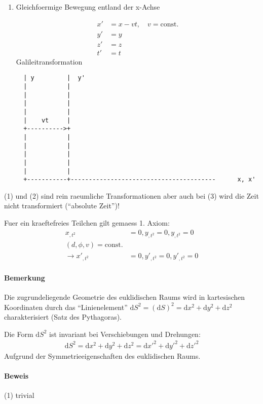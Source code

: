 \documentclass{scrartcl}
\begin{document}
\begin{enumerate}
\item Gleichfoermige Bewegung entland der x-Achse

\begin{align}
  x'&=x-vt,\quad v=\textrm{const.}\\
  y'&=y \\
  z'&=z \\
  t'&=t
\end{align}
Galileitransformation

\begin{verbatim}
  | y         |  y'
  |           |
  |           |
  |           |
  |           |
  |    vt     |
  +---------->+
  |           |
  |           |
  |           |
  |           |
  |           |
  +-----------+----------------------------------------      x, x'
\end{verbatim}


\end{enumerate}

(1) und (2) sind rein raeumliche Transformationen aber auch bei (3)
wird die Zeit nicht transformiert (``absolute Zeit'')!

Fuer ein kraeftefreies Teilchen gilt gemaess 1. Axiom:
\begin{align}
  x_{,t^2}&=0, y_{,t^2}=0, y_{,t^2}=0 \\
  (d,\phi,v)=\textrm{const.}\\
  \rightarrow
  x'_{,t^2}&=0, y'_{,t^2}=0, y'_{,t^2}=0
\end{align}

\renewcommand{\d}{\textrm{d}}

\paragraph{Bemerkung}
Die zugrundeliegende Geometrie des euklidischen Raums wird in
kartesischen Koordinaten durch das ``Linienelement'' $\d S^2=(\d
S)^2=\d x^2+ \d y^2 + \d z^2$ charakterisiert (Satz des Pythagoras).

Die Form $\d S^2$ ist invariant bei Verschiebungen und Drehungen:
\begin{align}
  \d S^2=\d x^2+ \d y^2 + \d z^2=\d x'^2+ \d y'^2 + \d z'^2
\end{align}
Aufgrund der Symmetrieeigenschaften des euklidischen Raums.

\paragraph{Beweis}
(1) trivial
\end{document}
